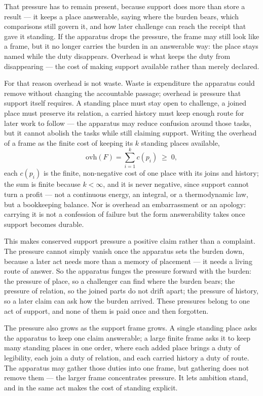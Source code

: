 That pressure has to remain present, because support does more than store a result --- it keeps a place answerable, saying where the burden bears, which comparisons still govern it, and how later challenge can reach the receipt that gave it standing. If the apparatus drops the pressure, the frame may still look like a frame, but it no longer carries the burden in an answerable way: the place stays named while the duty disappears. Overhead is what keeps the duty from disappearing --- the cost of making support available rather than merely declared.

For that reason overhead is not waste. Waste is expenditure the apparatus could remove without changing the accountable passage; overhead is pressure that support itself requires. A standing place must stay open to challenge, a joined place must preserve its relation, a carried history must keep enough route for later work to follow --- the apparatus may reduce confusion around those tasks, but it cannot abolish the tasks while still claiming support. Writing the overhead of a frame as the finite cost of keeping its $k$ standing places available,
\[ \mathrm{ovh}(F) = \sum_{i=1}^{k} c(p_i) \;\geq\; 0, \]
each $c(p_i)$ is the finite, non-negative cost of one place with its joins and history; the sum is finite because $k < \infty$, and it is never negative, since support cannot turn a profit --- not a continuous energy, an integral, or a thermodynamic law, but a bookkeeping balance. Nor is overhead an embarrassment or an apology: carrying it is not a confession of failure but the form answerability takes once support becomes durable.

This makes conserved support pressure a positive claim rather than a complaint. The pressure cannot simply vanish once the apparatus sets the burden down, because a later act needs more than a memory of placement --- it needs a living route of answer. So the apparatus funges the pressure forward with the burden: the pressure of place, so a challenger can find where the burden bears; the pressure of relation, so the joined parts do not drift apart; the pressure of history, so a later claim can ask how the burden arrived. These pressures belong to one act of support, and none of them is paid once and then forgotten.

The pressure also grows as the support frame grows. A single standing place asks the apparatus to keep one claim answerable; a large finite frame asks it to keep many standing places in one order, where each added place brings a duty of legibility, each join a duty of relation, and each carried history a duty of route. The apparatus may gather those duties into one frame, but gathering does not remove them --- the larger frame concentrates pressure. It lets ambition stand, and in the same act makes the cost of standing explicit.


